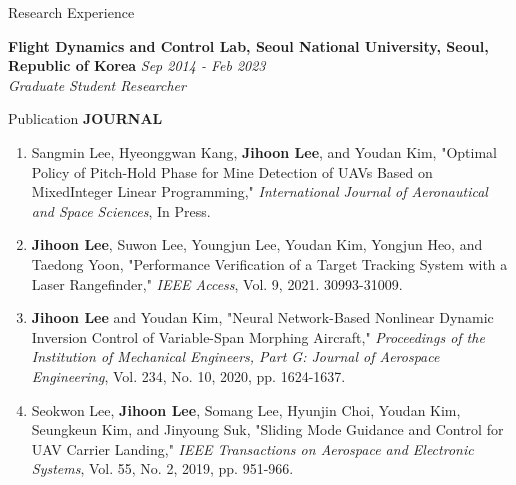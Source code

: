 \documentclass{resume}
\begin{document}
\begin{rSection}{Research Experience}\normalfont

{\bf Flight Dynamics and Control Lab, Seoul National University, Seoul, Republic of Korea} \hfill {\em Sep 2014 - Feb 2023} 
\\{\textit{Graduate Student Researcher}}

\end{rSection}

\begin{rSection}{Publication}\normalfont
	\textbf{JOURNAL}
	\begin{enumerate}\renewcommand{\labelenumi}{[J\theenumi]}
		\item Sangmin Lee, Hyeonggwan Kang, \textbf{\color{coolblack}Jihoon Lee}, and Youdan Kim, "Optimal Policy of Pitch-Hold Phase for Mine Detection of UAVs Based on MixedInteger Linear Programming," \textit{International Journal of Aeronautical and Space Sciences}, In Press.
		
		\item \textbf{\color{coolblack}Jihoon Lee}, Suwon Lee, Youngjun Lee, Youdan Kim, Yongjun Heo, and Taedong Yoon, "Performance Veriﬁcation of a Target Tracking System with a Laser Rangeﬁnder," \textit{IEEE Access}, Vol. 9, 2021. 30993-31009. 
		
		\item \textbf{\color{coolblack}Jihoon Lee} and Youdan Kim, "Neural Network-Based Nonlinear Dynamic Inversion Control of Variable-Span Morphing Aircraft," \textit{Proceedings of the Institution of Mechanical Engineers, Part G: Journal of Aerospace Engineering}, Vol. 234, No. 10, 2020, pp. 1624-1637. 
		
		\item Seokwon Lee, \textbf{\color{coolblack}Jihoon Lee}, Somang Lee, Hyunjin Choi, Youdan Kim, Seungkeun Kim, and Jinyoung Suk, "Sliding Mode Guidance and Control for UAV Carrier Landing," \textit{IEEE Transactions on Aerospace and Electronic Systems}, Vol. 55, No. 2, 2019, pp. 951-966. 
		

\end{enumerate}
\end{rSection}
\end{document}
